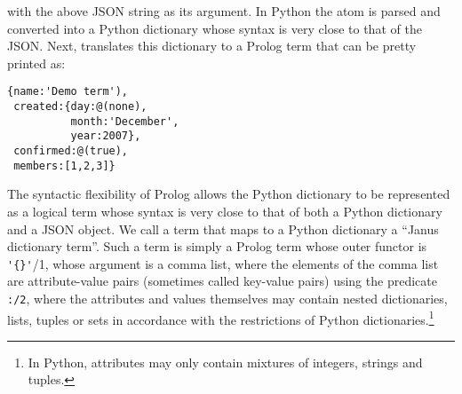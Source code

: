 \begin{example}
\noindent
with the above JSON string as its argument.
In Python the atom is parsed and converted into a Python dictionary
whose syntax is very close to that of the JSON.  Next, \janus{}
translates this dictionary to a Prolog term that can be pretty
printed as:
\begin{verbatim}
{name:'Demo term'),
 created:{day:@(none),
          month:'December',
          year:2007},
 confirmed:@(true),
 members:[1,2,3]}
\end{verbatim}
The syntactic flexibility of Prolog allows the Python dictionary to be
represented as a logical term whose syntax is very close to that of
both a Python dictionary and a JSON object.  We call a term that maps
to a Python dictionary a ``Janus dictionary term''.  Such a term is
simply a Prolog term whose outer functor is \verb|'{}'|/1, whose
argument is a comma list, where the elements of the comma list are
attribute-value pairs (sometimes called key-value pairs) using the
predicate {\tt :/2}, where the attributes and values themselves may
contain nested dictionaries, lists, tuples or sets in accordance with
the restrictions of Python dictionaries.\footnote{In Python,
attributes may only contain mixtures of integers, strings and tuples.}
\end{example}

